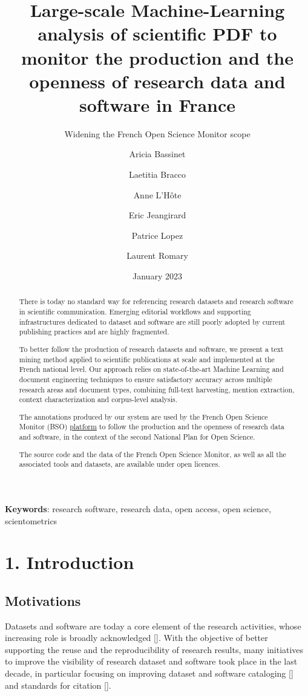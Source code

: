\documentclass[
]{article}
\title{Large-scale Machine-Learning analysis of scientific PDF to
monitor the production and the openness of research data and software in
France}
\subtitle{Widening the French Open Science Monitor scope}
\author[%
  2%
  ]{%
  Aricia Bassinet%
}
\author[%
  2%
  ]{%
  Laetitia Bracco%
}
\author[%
  1%
  ]{%
  Anne L'Hôte%
}
\author[%
  1%
  ]{%
  Eric Jeangirard%
}
\author[%
  3%
  ]{%
  Patrice Lopez%
}
\author[%
  4%
  ]{%
  Laurent Romary%
}
\affil[1]{French Ministry of Higher Education, Research, Paris, France}
\affil[2]{University of Lorraine, France}
\affil[3]{science-miner, France}
\affil[4]{Inria, France}
\date{January 2023}
\begin{document}
\maketitle
\begin{abstract}
There is today no standard way for referencing research datasets and
research software in scientific communication. Emerging editorial
workflows and supporting infrastructures dedicated to dataset and
software are still poorly adopted by current publishing practices and
are highly fragmented.

To better follow the production of research datasets and software, we
present a text mining method applied to scientific publications at scale
and implemented at the French national level. Our approach relies on
state-of-the-art Machine Learning and document engineering techniques to
ensure satisfactory accuracy across multiple research areas and document
types, combining full-text harvesting, mention extraction, context
characterization and corpus-level analysis.

The annotations produced by our system are used by the French Open
Science Monitor (BSO)
\href{https://frenchopensciencemonitor.esr.gouv.fr}{platform} to follow
the production and the openness of research data and software, in the
context of the second National Plan for Open Science.

The source code and the data of the French Open Science Monitor, as well
as all the associated tools and datasets, are available under open
licences.
\end{abstract}

\textbf{Keywords}: research software, research data, open access, open
science, scientometrics

\hypertarget{introduction}{%
\section{1. Introduction}\label{introduction}}

\hypertarget{motivations}{%
\subsection{Motivations}\label{motivations}}

Datasets and software are today a core element of the research
activities, whose increasing role is broadly acknowledged {[}{]}. With
the objective of better supporting the reuse and the reproducibility of
research results, many initiatives to improve the visibility of research
dataset and software took place in the last decade, in particular
focusing on improving dataset and software cataloging {[}{]} and
standards for citation {[}{]}.
\end{document}
